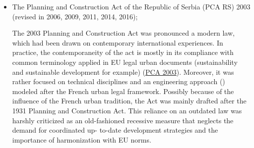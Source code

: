 \documentclass[11pt]{report}
\begin{document}
{{{{\begin{itemize}
\item The Planning and Construction Act of the Republic of Serbia (PCA RS) 2003 (revised in 2006, 2009, 2011, 2014, 2016);

The 2003 Planning and Construction Act was pronounced a modern law, which had been drawn on contemporary international experiences. In practice, the contemporaneity of the act is mostly in its compliance with common terminology applied in EU legal urban documents (sustainability and sustainable development for example) (\href{Zakon}{PCA 2003}).
Moreover, it was rather focused on technical disciplines and an engineering approach (\href{Nedovic}{\citealt{nedovicbudic_waves_2006}}) modeled after the French urban legal framework.
Possibly because of the influence of the French urban tradition, the Act was mainly drafted after the 1931 Planning and Construction Act. This reliance on an outdated law was harshly criticized as an old-fashioned recessive measure that neglects the demand for coordinated up- to-date development strategies and the importance of harmonization with EU norms.
\\


\end{itemize}}}}}
\end{document}
